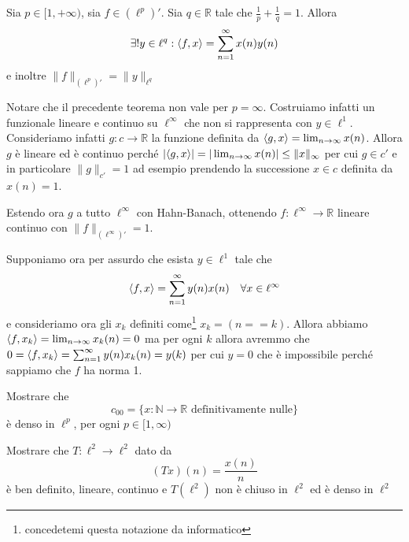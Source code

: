 \begin{theorem}{}
    Sia \(p \in [1, +\infty)\), sia \(f \in {(\ell^{p})}'\). Sia \(q \in \mathbb{R} \) tale che \(\frac{1}{p} + \frac{1}{q} = 1\). Allora
    \[
      \exists ! y \in \ell^{q} : {\left\langle f, x\right\rangle} = \sum_{n=1}^{\infty} x{(n)}y{(n)} 
    \]
    e inoltre \(\|f\|_{{(\ell^{p})}'} = \|y\|_{\ell^{q}}  \) 
\end{theorem}
Notare che il precedente teorema non vale per \(p = \infty\). Costruiamo infatti
un funzionale lineare e continuo su \(\ell^{\infty}\) che non si rappresenta con
\(y \in \ell^{1}\). Consideriamo infatti
    \(g : c \to \mathbb{R}\) la funzione definita da \({\left\langle g, x\right\rangle} = \lim_{n \to \infty} x{(n)}\). Allora \(g\) è lineare ed è continuo perché \(|{\left\langle g,x\right\rangle} | = | \lim_{n \to \infty} x{(n)} | \le \|x\|_{\infty} \) per cui \(g \in c'\) e in particolare \(\|g\|_{c'} = 1\) ad esempio prendendo la successione \(x \in c\) definita da \(x{(n)} = 1\).

    Estendo ora \(g\) a tutto \(\ell^{\infty}\) con Hahn-Banach, ottenendo \(f :
    \ell^{\infty} \to \mathbb{R}\) lineare continuo con \(\|f\|_{(\ell^{\infty})'} = 1 \).

    Supponiamo ora per assurdo che esista \(y \in \ell^{1}\) tale che
    \[
      {\left\langle f, x\right\rangle} = \sum_{n=1}^{\infty} y{(n)}x{(n)} \quad \forall x \in \ell^{\infty} 
    \]
    e consideriamo ora gli \(x_k\) definiti come\footnote{concedetemi questa notazione da informatico} \(x_k = {(n == k)}\). Allora abbiamo \({\left\langle f, x_k\right\rangle} = \lim_{n \to \infty} x_k{(n)} = 0\) ma per ogni \(k\) allora avremmo che \\ \(0 = {\left\langle f, x_k\right\rangle} = \sum_{n=1}^{\infty} y{(n)}x_k{(n)} = y{(k)} \) per cui \(y = 0\) che è impossibile perché sappiamo che \(f\) ha norma 1.



\begin{eser}{}
    Mostrare che
    \[
        c_{00} = \{x : \mathbb{N}\to \mathbb{R} \text{ definitivamente nulle}\} 
    \]
    è denso in \(\ell^{p}\), per ogni \(p \in [1, \infty)\) 
\end{eser}

\begin{eser}{}
Mostrare che \(T : \ell^2 \to \ell^2\) dato da 
\[
  {(Tx)}{(n)} = \frac{x{(n)}}{n}
\]
è ben definito, lineare, continuo e \(T{(\ell^2)}\) non è chiuso in \(\ell^2\)
ed è denso in \(\ell^2\) 
    
\end{eser}\label{eser:Txn}

